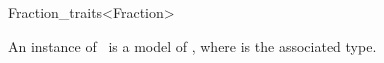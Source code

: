 \begin{ccRefClass}{Fraction_traits<Fraction>}

\ccDefinition

An instance of \ccClassTemplateName\ is a model of ,
where  is the associated type. 


\ccSeeAlso
{}\\

\end{ccRefClass} 